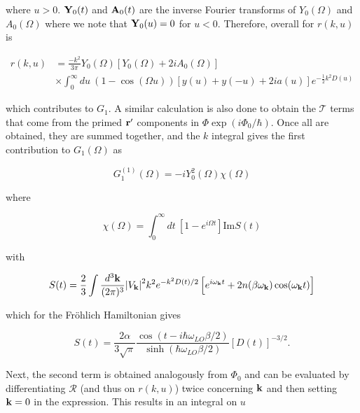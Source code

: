 where $u > 0$. $\vb{Y}_0(t)$ and $\vb{A}_0(t)$ are the inverse Fourier transforms of $Y_0(\Omega)$ and $A_0(\Omega)$ where we note that $\vb{Y}_0(u) = 0$ for $u < 0$. Therefore, overall for $r(k, u)$ is 

\begin{equation}
    \begin{aligned}
        r(k, u) &= \frac{-k^2}{3\pi} Y_0(\Omega) \left[ Y_0(\Omega) + 2i A_0(\Omega) \right] \\
        &\times \int^\infty_0 du\ (1 - \cos(\Omega u)) \left[ y(u) + y(-u) + 2ia(u) \right] e^{-\frac{1}{2}k^2D(u)}
    \end{aligned}
\end{equation}

which contributes to $G_1$. A similar calculation is also done to obtain the $\mathcal{T}$ terms that come from the primed $\vb{r'}$ components in $\Phi \exp(i \Phi_0 / \hbar)$. Once all are obtained, they are summed together, and the $k$ integral gives the first contribution to $G_1(\Omega)$ as

\begin{equation}
    G^{(1)}_1(\Omega) = -iY_0^2(\Omega) \chi(\Omega)
\end{equation}

where

\begin{equation}\label{eqn:fhip_chi}
    \chi(\Omega) = \int_0^\infty dt\ \left[ 1 - e^{i \Omega t} \right] \text{Im} S(t)
\end{equation}

with

\begin{equation}\label{eqn:S}
    \begin{aligned}
        S(t) = \frac{2}{3} \int \frac{d^3\vb{k}}{(2\pi)^3} \abs{V_{\vb{k}}}^2 k^2 e^{-k^2 D(t) / 2} \left[ e^{i\omega_{\vb{k}}t} + 2n(\beta\omega_{\vb{k}}) \cos(\omega_{\vb{k}}t) \right]
    \end{aligned}
\end{equation}

which for the Fr\"ohlich Hamiltonian gives

\begin{equation}\label{eqn:dynamic_structure}
    S(t) =  \frac{2\alpha}{3\sqrt{\pi}} \frac{\cos\left(t - i\hbar\omega_{LO}\beta/2\right)}{\sinh\left(\hbar\omega_{LO} \beta / 2 \right)} \left[D(t)\right]^{-3/2}.
\end{equation}

Next, the second term is obtained analogously from $\Phi_0$ and can be evaluated by differentiating $\mathcal{R}$ (and thus on $r(k, u)$) twice concerning $\vb{k}$ and then setting $\vb{k} = 0$ in the expression. This results in an integral on $u$

